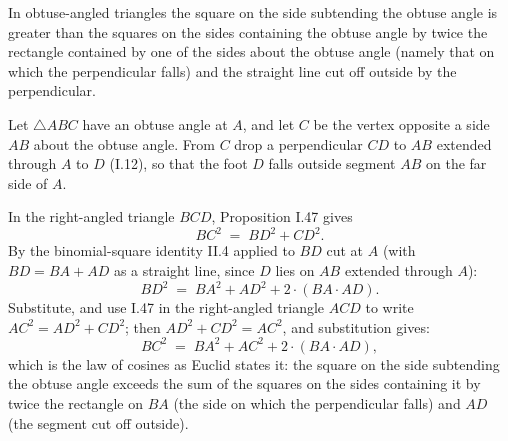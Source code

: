 \begin{claim}
\label{prop:II.12}
In obtuse-angled triangles the square on the side subtending the
obtuse angle is greater than the squares on the sides containing the
obtuse angle by twice the rectangle contained by one of the sides
about the obtuse angle (namely that on which the perpendicular falls)
and the straight line cut off outside by the perpendicular.
\end{claim}
\begin{evidence}[Proof of II.12]
\label{ev:II.12}
Let $\triangle ABC$ have an obtuse angle at $A$, and let $C$ be the
vertex opposite a side $AB$ about the obtuse angle.  From $C$ drop a
perpendicular $CD$ to $AB$ extended through $A$ to $D$ (I.12), so
that the foot $D$ falls outside segment $AB$ on the far side of $A$.

In the right-angled triangle $BCD$, Proposition I.47 gives
\[
    BC^2 \;=\; BD^2 + CD^2.
\]
By the binomial-square identity II.4 applied to $BD$ cut at $A$
(with $BD = BA + AD$ as a straight line, since $D$ lies on $AB$
extended through $A$):
\[
    BD^2 \;=\; BA^2 + AD^2 + 2\cdot(BA \cdot AD).
\]
Substitute, and use I.47 in the right-angled triangle $ACD$ to
write $AC^2 = AD^2 + CD^2$; then $AD^2 + CD^2 = AC^2$, and
substitution gives:
\[
    BC^2 \;=\; BA^2 + AC^2 + 2\cdot(BA \cdot AD),
\]
which is the law of cosines as Euclid states it: the square on the
side subtending the obtuse angle exceeds the sum of the squares on
the sides containing it by twice the rectangle on $BA$ (the side
on which the perpendicular falls) and $AD$ (the segment cut off
outside).
\end{evidence}

